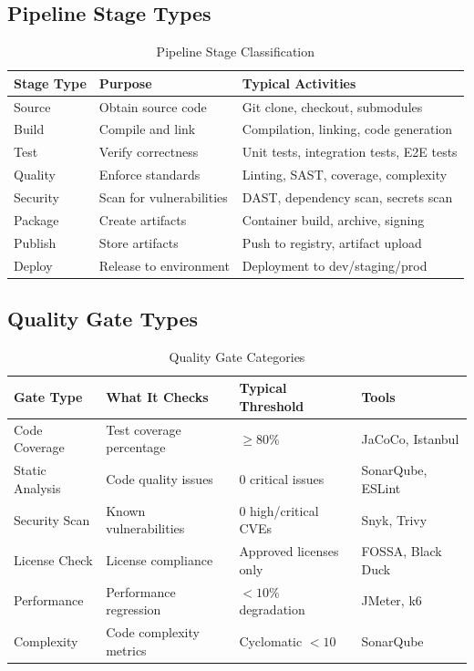 \documentclass[11pt,letterpaper]{article}
\begin{document}
\subsection{Pipeline Stage Types}

\begin{table}[H]
\centering
\caption{Pipeline Stage Classification}
\small
\begin{tabular}{@{}L{2.5cm}L{4cm}L{6cm}@{}}
\toprule
\textbf{Stage Type} & \textbf{Purpose} & \textbf{Typical Activities} \\
\midrule
Source & Obtain source code & Git clone, checkout, submodules \\
\addlinespace
Build & Compile and link & Compilation, linking, code generation \\
\addlinespace
Test & Verify correctness & Unit tests, integration tests, E2E tests \\
\addlinespace
Quality & Enforce standards & Linting, SAST, coverage, complexity \\
\addlinespace
Security & Scan for vulnerabilities & DAST, dependency scan, secrets scan \\
\addlinespace
Package & Create artifacts & Container build, archive, signing \\
\addlinespace
Publish & Store artifacts & Push to registry, artifact upload \\
\addlinespace
Deploy & Release to environment & Deployment to dev/staging/prod \\
\bottomrule
\end{tabular}
\end{table}

\subsection{Quality Gate Types}

\begin{table}[H]
\centering
\caption{Quality Gate Categories}
\small
\begin{tabular}{@{}L{2.5cm}L{3.5cm}L{3cm}L{3cm}@{}}
\toprule
\textbf{Gate Type} & \textbf{What It Checks} & \textbf{Typical Threshold} & \textbf{Tools} \\
\midrule
Code Coverage & Test coverage percentage & $\geq 80\%$ & JaCoCo, Istanbul \\
\addlinespace
Static Analysis & Code quality issues & 0 critical issues & SonarQube, ESLint \\
\addlinespace
Security Scan & Known vulnerabilities & 0 high/critical CVEs & Snyk, Trivy \\
\addlinespace
License Check & License compliance & Approved licenses only & FOSSA, Black Duck \\
\addlinespace
Performance & Performance regression & $< 10\%$ degradation & JMeter, k6 \\
\addlinespace
Complexity & Code complexity metrics & Cyclomatic $< 10$ & SonarQube \\
\bottomrule
\end{tabular}
\end{table}
\end{document}
